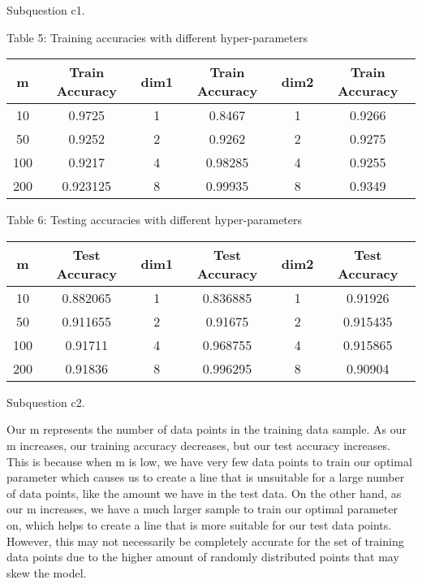 \documentclass[12pt]{article}
\newcounter{ques}
\newenvironment{question}{\stepcounter{ques}{\noindent\bf Question \arabic{ques}:}}{\vspace{5mm}}
\begin{document}
\begin{question}

Subquestion c1.

\begin{center}
Table 5: Training accuracies with different hyper-parameters
\end{center}
\begin{table}[h]
\centering
\begin{tabular}{c c|c c|c c}
    \textbf{m} & \textbf{Train Accuracy} & \textbf{dim1} & \textbf{Train Accuracy} & \textbf{dim2} & \textbf{Train Accuracy} \\
    \hline
    10  & 0.9725  & 1  & 0.8467  & 1  & 0.9266 \\
    50  & 0.9252  & 2  & 0.9262  & 2  & 0.9275 \\
    100 & 0.9217  & 4  & 0.98285  & 4  & 0.9255 \\
    200 & 0.923125  & 8  & 0.99935  & 8  & 0.9349 \\
\end{tabular}
\end{table}

\begin{center}
Table 6: Testing accuracies with different hyper-parameters
\end{center}
\begin{table}[h]
\centering
\begin{tabular}{c c|c c|c c}
    \textbf{m} & \textbf{Test Accuracy} & \textbf{dim1} & \textbf{Test Accuracy} & \textbf{dim2} & \textbf{Test Accuracy} \\
    \hline
    10  & 0.882065  & 1  & 0.836885  & 1  & 0.91926 \\
    50  & 0.911655  & 2  & 0.91675  & 2  & 0.915435 \\
    100 & 0.91711  & 4  & 0.968755  & 4  & 0.915865 \\
    200 & 0.91836  & 8  & 0.996295  & 8  & 0.90904 \\
\end{tabular}
\end{table}

Subquestion c2.

Our m represents the number of data points in the training data sample. As our m increases, our training accuracy decreases, but our test accuracy increases. This is because when m is low, we have very few data points to train our optimal parameter which causes us to create a line that is unsuitable for a large number of data points, like the amount we have in the test data. On the other hand, as our m increases, we have a much larger sample to train our optimal parameter on, which helps to create a line that is more suitable for our test data points. However, this may not necessarily be completely accurate for the set of training data points due to the higher amount of randomly distributed points that may skew the model.


\end{question}
\end{document}
